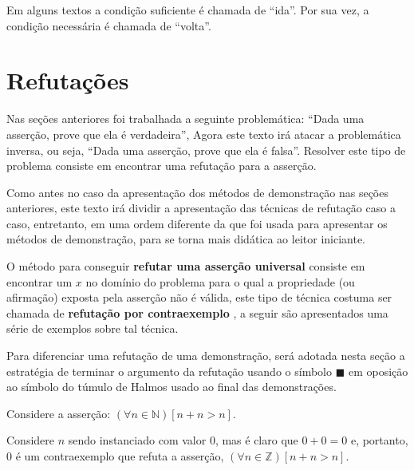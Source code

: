 \begin{nota}[Nomenclatura!]
  Em alguns textos \cite{fmcbook, benjaLivro2010} a condição suficiente é chamada de ``ida''. Por sua vez, a condição necessária é chamada de ``volta''.
\end{nota}

\section{Refutações}

Nas seções anteriores foi trabalhada a seguinte problemática: ``Dada uma asserção, prove que ela é verdadeira'', Agora este texto irá atacar a problemática inversa, ou seja, ``Dada uma asserção, prove que ela é falsa''. Resolver este tipo de problema consiste em encontrar uma refutação para a asserção.

Como antes no caso da apresentação dos métodos de demonstração nas seções anteriores, este texto irá dividir a apresentação das técnicas de refutação caso a caso, entretanto, em uma ordem diferente da que foi usada para apresentar os métodos de demonstração, para se torna mais didática ao leitor iniciante.

O método para conseguir \textbf{refutar uma asserção universal} consiste em encontrar um $x$ no domínio do problema para o qual a propriedade (ou afirmação) exposta pela asserção não é válida, este tipo de técnica costuma ser chamada de \textbf{refutação por contraexemplo} \cite{hammack2017}, a seguir são apresentados uma série de exemplos sobre tal técnica.

\begin{nota}
	Para diferenciar uma refutação de uma demonstração, será adotada nesta seção a estratégia de terminar o argumento da refutação usando o símbolo $\blacksquare$ em oposição ao símbolo do túmulo de Halmos usado ao final das demonstrações. 
\end{nota}

\begin{exemplo}\label{exe:Refutacao1}
	Considere a asserção: $(\forall n \in \mathbb{N})[n + n > n]$.
	
	\begin{refute}
		Considere $n$ sendo instanciado com valor $0$, mas é claro que $0 + 0 = 0$ e, portanto, $0$ é um contraexemplo que refuta a asserção, $(\forall n \in \mathbb{Z})[n + n > n]$.
	\end{refute}
\end{exemplo}

